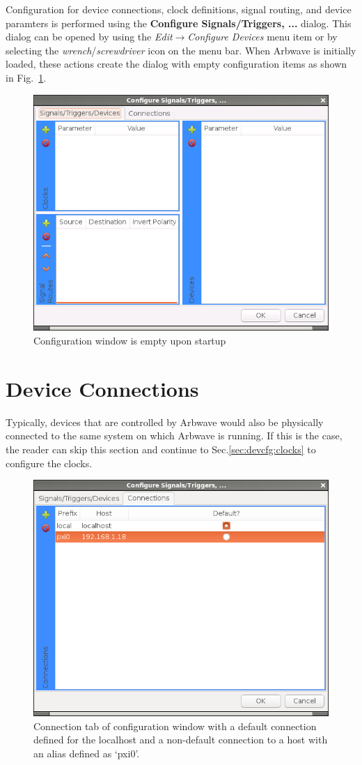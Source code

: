 \thispagestyle{fancy}
\pagestyle{fancy}

Configuration for device connections, clock definitions, signal routing, and
device paramters is performed using the \textbf{Configure Signals/Triggers, ...}
dialog.  This dialog can be opened by using the
\textit{Edit$\rightarrow$Configure Devices} menu item or by selecting the
\textit{wrench}/\textit{screwdriver} icon on the menu bar.  When Arbwave is
initially loaded, these actions create the dialog with empty configuration items
as shown in Fig.~\ref{fig:devcfg:empty}.

\begin{figure}[h!]
  \centerline{\includegraphics[width=.5\textwidth]{figures/empty}}
  \caption{Configuration window is empty upon startup}
  \label{fig:devcfg:empty}
\end{figure}


\section{Device Connections}\label{sec:devcfg:conn}
Typically, devices that are controlled by Arbwave would also be physically
connected to the same system on which Arbwave is running.  If this is the case,
the reader can skip this section and continue to Sec.\ref{sec:devcfg:clocks} to
configure the clocks.


\begin{figure}[h!]
  \centerline{\includegraphics[width=.5\textwidth]{figures/connections}}
  \caption{Connection tab of configuration window with a default connection defined for
  the localhost and a non-default connection to a host with an alias defined as
  `pxi0'.}
  \label{fig:devcfg:connection}
\end{figure}

